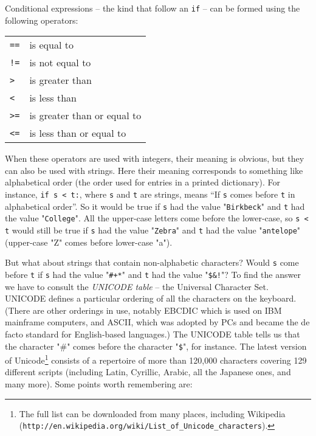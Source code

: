 Conditional expressions -- the kind that follow an \verb!if! --
can be formed using the following operators:
\medskip

\begin{tabular}{ll}
\verb+==+ &is equal to\\
\verb+!=+ &is not equal to\\
\verb+>+ &is greater than\\
\verb+<+ &is less than\\
\verb+>=+ & is greater than or equal to\\
\verb+<=+ &is less than or equal to\\
\end{tabular}
\medskip

When these operators are used with integers, their meaning is obvious,
but they can also be used with strings.  Here their meaning corresponds
to something like alphabetical order (the order used for entries in a
printed dictionary).  For instance, \verb!if s < t:!,
where  \verb!s! and \verb!t! are strings, means ``If  \verb!s! comes before \verb!t!
in alphabetical order''.  So it would be true if  \verb!s! had the value
"\verb!Birkbeck!" and \verb!t! had the value "\verb!College!".  All the
upper-case letters come before the lower-case, so \verb!s < t! would
still be true if  \verb!s! had the value "\verb!Zebra!" and \verb!t! had the
value "\verb!antelope!" (upper-case "Z" comes before lower-case "a").

But what about strings that contain non-alphabetic characters?  Would
\verb!s!  come before \verb!t! if \verb!s! had the value "\verb!#+*!"
and \verb!t! had the value "\verb+$&!+"?  To find the answer we have
to consult the \emph{UNICODE table} -- the Universal Character Set.
UNICODE defines a particular ordering of all the characters on the
keyboard.  (There are other orderings in use, notably EBCDIC which is
used on IBM mainframe computers, and ASCII, which was adopted by PCs and
became the de facto standard for English-based languages.)
The UNICODE table tells us that the character "\#" comes before the
character "\verb!$!", for instance.  The latest version of Unicode\footnote{The full list can be downloaded from many
places, including Wikipedia
(\texttt{http://en.wikipedia.org/wiki/List\_of\_Unicode\_characters}).}
consists of a repertoire of more than 120,000 characters covering 129
different scripts (including Latin, Cyrillic, Arabic, all the Japanese
ones, and many more). Some points worth remembering are:


